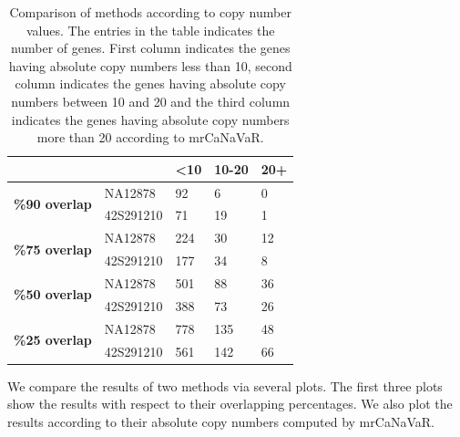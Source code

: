 \begin{table}[!htbp]
\centering
\begin{tabular}{lllll}
\hline
\multicolumn{2}{l}{}                                                                         & \textbf{\textless{}10} & \textbf{10-20} & \textbf{20+} \\ \hline
\multicolumn{1}{l|}{\multirow{2}{*}{\textbf{\%90 overlap}}} & \multicolumn{1}{l|}{NA12878}   & 92                        & 6              & 0            \\ \cline{2-5} 
\multicolumn{1}{l|}{}                                       & \multicolumn{1}{l|}{42S291210} & 71                        & 19             & 1            \\ \hline
\multicolumn{1}{l|}{\multirow{2}{*}{\textbf{\%75 overlap}}} & \multicolumn{1}{l|}{NA12878}   & 224                       & 30             & 12           \\ \cline{2-5} 
\multicolumn{1}{l|}{}                                       & \multicolumn{1}{l|}{42S291210} & 177                       & 34             & 8            \\ \hline
\multicolumn{1}{l|}{\multirow{2}{*}{\textbf{\%50 overlap}}} & \multicolumn{1}{l|}{NA12878}   & 501                       & 88             & 36           \\ \cline{2-5} 
\multicolumn{1}{l|}{}                                       & \multicolumn{1}{l|}{42S291210} & 388                       & 73             & 26           \\ \hline
\multicolumn{1}{l|}{\multirow{2}{*}{\textbf{\%25 overlap}}} & \multicolumn{1}{l|}{NA12878}   & 778                       & 135            & 48           \\ \cline{2-5} 
\multicolumn{1}{l|}{}                                       & \multicolumn{1}{l|}{42S291210} & 561                       & 142            & 66           \\ \hline
\end{tabular}
\caption{Comparison of methods according to copy number values. The entries in the table indicates the number of genes. First column indicates the genes having absolute copy numbers less than 10, second column indicates the genes having absolute copy numbers between 10 and 20 and the third column indicates the genes having absolute copy numbers more than 20 according to mrCaNaVaR.}
\label{overlapVScnvNo}
\end{table}

We compare the results of two methods via several plots. The first three plots show the results with respect to their overlapping percentages. We also plot the results according to their absolute copy numbers computed by mrCaNaVaR.

